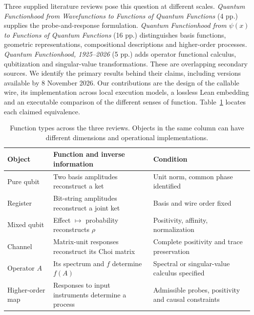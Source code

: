 \documentclass[a4paper,onecolumn,11pt,unpublished]{quantumarticle}
\begin{document}
Three supplied literature reviews pose this question at different scales. \emph{Quantum Functionhood from Wavefunctions to Functions of Quantum Functions} (4 pp.) supplies the probe-and-response formulation. \emph{Quantum Functionhood from $\psi(x)$ to Functions of Quantum Functions} (16 pp.) distinguishes basis functions, geometric representations, compositional descriptions and higher-order processes. \emph{Quantum Functionhood, 1925--2026} (5 pp.) adds operator functional calculus, qubitization and singular-value transformations. These are overlapping secondary sources. We identify the primary results behind their claims, including versions available by 8 November 2026. Our contributions are the design of the callable wire, its implementation across local execution models, a lossless Lean embedding and an executable comparison of the different senses of function. Table~\ref{tab:levels} locates each claimed equivalence.

\begin{table}[ht]
\centering\small
\begin{tabularx}{\linewidth}{@{}lXX@{}}
\toprule Object & Function and inverse information & Condition\\\midrule
Pure qubit & Two basis amplitudes reconstruct a ket & Unit norm, common phase identified\\
Register & Bit-string amplitudes reconstruct a joint ket & Basis and wire order fixed\\
Mixed qubit & Effect $\mapsto$ probability reconstructs $\rho$ & Positivity, affinity, normalization\\
Channel & Matrix-unit responses reconstruct its Choi matrix & Complete positivity and trace preservation\\
Operator $A$ & Its spectrum and $f$ determine $f(A)$ & Spectral or singular-value calculus specified\\
Higher-order map & Responses to input instruments determine a process & Admissible probes, positivity and causal constraints\\
\bottomrule
\end{tabularx}
\caption{Function types across the three reviews. Objects in the same column can have different dimensions and operational implementations.}\label{tab:levels}
\end{table}





\end{document}
